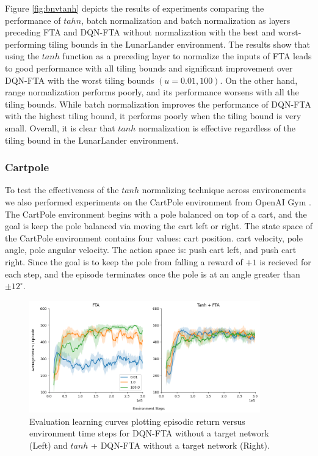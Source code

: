 \documentclass{article}
\begin{document}
Figure \ref{fig:bnvtanh} depicts the results of experiments comparing the performance of $tahn$, batch normalization and batch normalization as layers preceding FTA and DQN-FTA without normalization with the best and worst-performing tiling bounds in the LunarLander environment. The results show that using the $tanh$ function as a preceding layer to normalize the inputs of FTA leads to good performance with all tiling bounds and significant improvement over DQN-FTA with the worst tiling bounds $(u = 0.01, 100)$. On the other hand, range normalization performs poorly, and its performance worsens with all the tiling bounds. While batch normalization improves the performance of DQN-FTA with the highest tiling bound, it performs poorly when the tiling bound is very small. Overall, it is clear that $tanh$ normalization is effective regardless of the tiling bound in the LunarLander environment.


\subsubsection{Cartpole}
To test the effectiveness of the $tanh$ normalizing technique across environements we also performed experiments on the CartPole environment from OpenAI Gym \cite{brockman2016gym}.
The CartPole environment begins with a pole balanced on top of a cart, and the goal is keep the pole balanced via moving the cart left or right.
The state space of the CartPole environment contains four values: cart position. cart velocity, pole angle, pole angular velocity. 
The action space is: push cart left, and push cart right.
Since the goal is to keep the pole from falling a reward of $+1$ is recieved for each step, and the episode terminates once the pole is at an angle greater than $\pm 12^\circ$.

\begin{figure}[h]
    \centering
    \includegraphics[width=10cm]{cartpole.png}
    \caption{Evaluation learning curves plotting episodic return versus environment time steps for DQN-FTA without a target network (Left) and $tanh$ + DQN-FTA without a target network (Right).}
    \label{fig:cartpole}
\end{figure}
\end{document}
